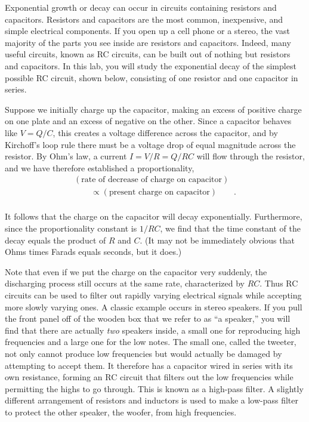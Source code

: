 Exponential growth or decay can occur in circuits containing
resistors and capacitors. Resistors and capacitors are the
most common, inexpensive, and simple electrical components.
If you open up a cell phone or a stereo, the vast majority
of the parts you see inside are resistors and capacitors.
Indeed, many useful circuits, known as RC circuits, can be
built out of nothing but resistors and capacitors. In this
lab, you will study the exponential decay of the simplest
possible RC circuit, shown below, consisting of one resistor
and one capacitor in series.


Suppose we initially charge up the capacitor, making an
excess of positive charge on one plate and an excess of
negative on the other. Since a capacitor behaves like
$V=Q/C$, this creates a voltage difference across the
capacitor, and by Kirchoff's loop rule there must be a
voltage drop of equal magnitude across the resistor. By
Ohm's law, a current $I=V/R=Q/RC$ will flow through
the resistor, and we have therefore established a proportionality,
\begin{gather*}
    (\text{rate of decrease of charge on capacitor}) \\
    \qquad	\propto(\text{present charge on capacitor})  \qquad .  \\
\end{gather*}

It follows that the charge on the capacitor will decay
exponentially. Furthermore, since the proportionality
constant is $1/RC$, we find that the time constant of the
decay equals the product of $R$ and $C$. (It may not be
immediately obvious that Ohms times Farads equals seconds, but it does.)

Note that even if we put the charge on the capacitor very
suddenly, the discharging process still occurs at the same
rate, characterized by $RC$. Thus RC circuits can be used to
filter out rapidly varying electrical signals while
accepting more slowly varying ones. A classic example occurs
in stereo speakers. If you pull the front panel off of the
wooden box that we refer to as ``a speaker,'' you will find
that there are actually \emph{two} speakers inside, a small
one for reproducing high frequencies and a large one for the
low notes. The small one, called the tweeter, not only
cannot produce low frequencies but would actually be damaged
by attempting to accept them. It therefore has a capacitor
wired in series with its own resistance, forming an RC
circuit that filters out the low frequencies while
permitting the highs to go through. This is known as a
high-pass filter. A slightly different arrangement of
resistors and inductors is used to make a low-pass filter
to protect the other speaker, the woofer, from high frequencies. 

